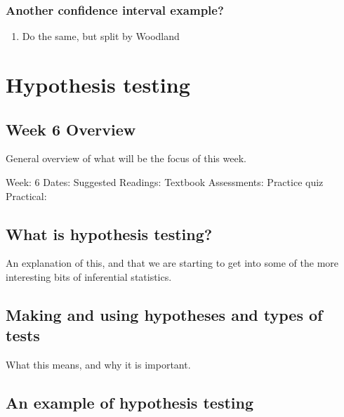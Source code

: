 \documentclass[
]{scrbook}
\providecommand{\tightlist}{%
  \setlength{\itemsep}{0pt}\setlength{\parskip}{0pt}}
\begin{document}
\hypertarget{another-confidence-interval-example}{%
\section{Another confidence interval example?}\label{another-confidence-interval-example}}

\begin{enumerate}
\def\labelenumi{\arabic{enumi}.}
\tightlist
\item
  Do the same, but split by Woodland
\end{enumerate}

\hypertarget{part-hypothesis-testing}{%
\part{Hypothesis testing}\label{part-hypothesis-testing}}

\hypertarget{Week6}{%
\chapter*{Week 6 Overview}\label{Week6}}

General overview of what will be the focus of this week.

Week: 6
Dates:
Suggested Readings: Textbook
Assessments: Practice quiz
Practical:

\hypertarget{what-is-hypothesis-testing}{%
\chapter{What is hypothesis testing?}\label{what-is-hypothesis-testing}}

An explanation of this, and that we are starting to get into some of the more interesting bits of inferential statistics.

\hypertarget{making-and-using-hypotheses-and-types-of-tests}{%
\chapter{Making and using hypotheses and types of tests}\label{making-and-using-hypotheses-and-types-of-tests}}

What this means, and why it is important.

\hypertarget{an-example-of-hypothesis-testing}{%
\chapter{An example of hypothesis testing}\label{an-example-of-hypothesis-testing}}
\end{document}
